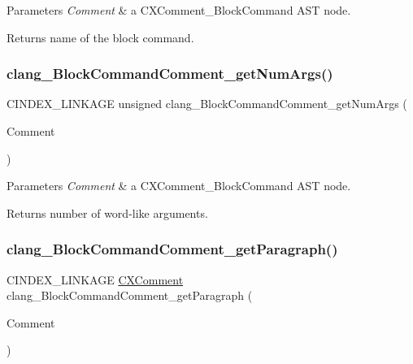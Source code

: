 \begin{DoxyParams}{Parameters}
{\em Comment} & a {\ttfamily C\+X\+Comment\+\_\+\+Block\+Command} A\+ST node.\\
\hline
\end{DoxyParams}
\begin{DoxyReturn}{Returns}
name of the block command. 
\end{DoxyReturn}
\mbox{\label{group__CINDEX__COMMENT_gacb447968ce9efdfdabbfca8918540cdf}} 
\subsubsection{\texorpdfstring{clang\+\_\+\+Block\+Command\+Comment\+\_\+get\+Num\+Args()}{clang\_BlockCommandComment\_getNumArgs()}}
{\footnotesize\ttfamily C\+I\+N\+D\+E\+X\+\_\+\+L\+I\+N\+K\+A\+GE unsigned clang\+\_\+\+Block\+Command\+Comment\+\_\+get\+Num\+Args (\begin{DoxyParamCaption}\item[{\mbox{\hyperlink{structCXComment}{C\+X\+Comment}}}]{Comment }\end{DoxyParamCaption})}


\begin{DoxyParams}{Parameters}
{\em Comment} & a {\ttfamily C\+X\+Comment\+\_\+\+Block\+Command} A\+ST node.\\
\hline
\end{DoxyParams}
\begin{DoxyReturn}{Returns}
number of word-\/like arguments. 
\end{DoxyReturn}
\mbox{\label{group__CINDEX__COMMENT_gac6f2ffc8fdbe9394bd4bb7d54327c968}} 
\subsubsection{\texorpdfstring{clang\+\_\+\+Block\+Command\+Comment\+\_\+get\+Paragraph()}{clang\_BlockCommandComment\_getParagraph()}}
{\footnotesize\ttfamily C\+I\+N\+D\+E\+X\+\_\+\+L\+I\+N\+K\+A\+GE \mbox{\hyperlink{structCXComment}{C\+X\+Comment}} clang\+\_\+\+Block\+Command\+Comment\+\_\+get\+Paragraph (\begin{DoxyParamCaption}\item[{\mbox{\hyperlink{structCXComment}{C\+X\+Comment}}}]{Comment }\end{DoxyParamCaption})}


